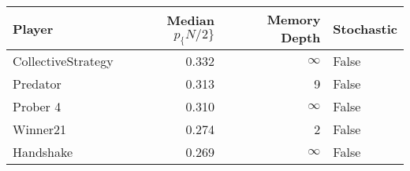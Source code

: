 \begin{tabular}{lrrl}
\toprule
             Player &  Median $p_\{N/2\}$ &  Memory Depth & Stochastic \\
\midrule
 CollectiveStrategy &             0.332 &            \(\infty\) &      False \\
           Predator &             0.313 &             9 &      False \\
           Prober 4 &             0.310 &            \(\infty\) &      False \\
           Winner21 &             0.274 &             2 &      False \\
          Handshake &             0.269 &            \(\infty\) &      False \\
\bottomrule
\end{tabular}
